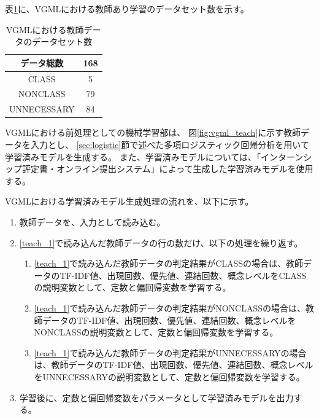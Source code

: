 表\ref{table:vgml_data_set}に、VGMLにおける教師あり学習のデータセット数を示す。

\begin{table}[t]
    \begin{center}
      \caption{VGMLにおける教師データのデータセット数}
      \label{table:vgml_data_set}
      \begin{tabular}{c|c}
        データ総数　& 168\\
        \hline
        \hline
        CLASS    & 5\\ \hline
        NONCLASS & 79\\ \hline
        UNNECESSARY   & 84\\ \hline
      \end{tabular}
    \end{center}
  \end{table}

VGMLにおける前処理としての機械学習部は、
図\ref{fig:vgml_teach}に示す教師データを入力とし、
\ref{sec:logistic}節で述べた多項ロジスティック回帰分析を用いて学習済みモデルを生成する。
また、学習済みモデルについては、「インターンシップ評定書・オンライン提出システム」によって生成した学習済みモデルを使用する。

VGMLにおける学習済みモデル生成処理の流れを、以下に示す。

\begin{enumerate}
	\item 教師データを、入力として読み込む。
    \label{teach_1}
	\item \ref{teach_1}で読み込んだ教師データの行の数だけ、以下の処理を繰り返す。
        \begin{enumerate}
            \item \ref{teach_1}で読み込んだ教師データの判定結果がCLASSの場合は、教師データのTF-IDF値、出現回数、優先値、連結回数、概念レベルをCLASSの説明変数として、定数と偏回帰変数を学習する。
            \item \ref{teach_1}で読み込んだ教師データの判定結果がNONCLASSの場合は、教師データのTF-IDF値、出現回数、優先値、連結回数、概念レベルをNONCLASSの説明変数として、定数と偏回帰変数を学習する。
            \item \ref{teach_1}で読み込んだ教師データの判定結果がUNNECESSARYの場合は、教師データのTF-IDF値、出現回数、優先値、連結回数、概念レベルをUNNECESSARYの説明変数として、定数と偏回帰変数を学習する。
        \end{enumerate}
	\item 学習後に、定数と偏回帰変数をパラメータとして学習済みモデルを出力する。
\end{enumerate}

